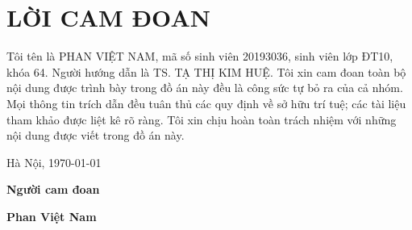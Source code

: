 \section*{LỜI CAM ĐOAN}
\thispagestyle{empty}
Tôi tên là PHAN VIỆT NAM, mã số sinh viên 20193036, sinh viên lớp ĐT10, khóa 64. Người hướng dẫn là TS. TẠ THỊ KIM HUỆ. Tôi xin cam đoan toàn bộ nội dung được trình bày trong đồ án này đều là công sức tự bỏ ra của cả nhóm. Mọi thông tin trích dẫn đều tuân thủ các quy định về sở hữu trí tuệ; các tài liệu tham khảo được liệt kê rõ ràng. Tôi xin chịu hoàn toàn trách nhiệm với những nội dung được viết trong đồ án này.

\vspace{6pt}
\hspace{8.3cm}Hà Nội, \today

\hspace{9cm}\textbf{Người cam đoan}

\vspace{2cm}
\hspace{9.25cm}\textbf{Phan Việt Nam}
\newpage